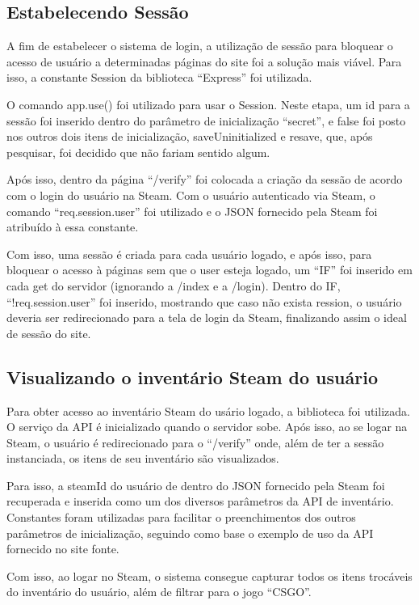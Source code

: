 \subsection{Estabelecendo Sessão}
A fim de estabelecer o sistema de login, a utilização de sessão para bloquear o acesso de usuário a 
determinadas páginas do site foi a solução mais viável. Para isso, a constante Session da biblioteca ``Express'' foi utilizada.

O comando app.use() foi utilizado para usar o Session. Neste etapa, um id para a sessão foi inserido dentro do 
parâmetro de inicialização ``secret'', e false foi posto nos outros dois itens de inicialização, saveUninitialized e resave, que, 
após pesquisar, foi decidido que não fariam sentido algum.

Após isso, dentro da página ``/verify'' foi colocada a criação da sessão de acordo com o login do usuário na Steam. 
Com o usuário autenticado via Steam, o comando ``req.session.user'' foi utilizado e o JSON fornecido pela Steam 
foi atribuído à essa constante.

Com isso, uma sessão é criada para cada usuário logado, e após isso, para bloquear o acesso à páginas sem que o user 
esteja logado, um ``IF'' foi inserido em cada get do servidor (ignorando a /index e a /login). Dentro do IF, 
``!req.session.user'' foi inserido, mostrando que caso não exista ression, o usuário deveria ser redirecionado para a 
tela de login da Steam, finalizando assim o ideal de sessão do site. 

\subsection{Visualizando o inventário Steam do usuário}
Para obter acesso ao inventário Steam do usário logado, a biblioteca  foi utilizada. 
O serviço da API é inicializado quando o servidor sobe. Após isso, ao se logar na Steam, o usuário é redirecionado para o ``/verify'' onde, 
além de ter a sessão instanciada, os itens de seu inventário são visualizados.

Para isso, a steamId do usuário de dentro do JSON fornecido pela Steam foi recuperada e inserida como um dos diversos parâmetros da API de 
inventário. Constantes foram utilizadas para facilitar o preenchimentos dos outros parâmetros de inicialização, seguindo como base o 
exemplo de uso da API fornecido no site fonte.

Com isso, ao logar no Steam, o sistema consegue capturar todos os itens trocáveis do inventário do usuário, 
além de filtrar para o jogo ``CSGO''.


